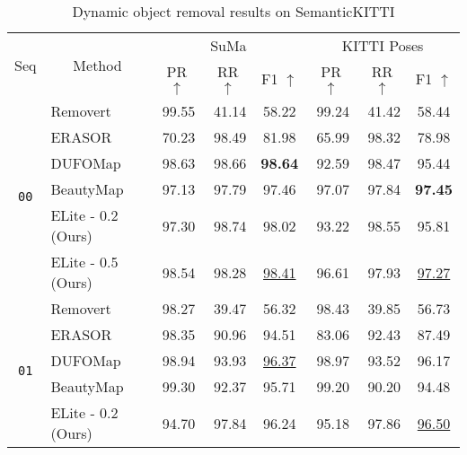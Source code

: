 \begin{table}[t!]
\centering
\caption{Dynamic object removal results on SemanticKITTI}
\begin{adjustbox}{width=1.0\linewidth}
{
\begin{tabular}{c|l|rrc|rrc}
\toprule[0.8pt]
\multicolumn{1}{l|}{\multirow{2}{*}{Seq}} & \multicolumn{1}{c|}{\multirow{2}{*}{Method}}  & \multicolumn{3}{c|}{SuMa \cite{behley2019semantickitti,behley2018efficient}} & \multicolumn{3}{c}{KITTI Poses \cite{geiger2013vision}} \\ \cmidrule{3-8}
                                             &                                               & \multicolumn{1}{c}{PR $\uparrow$} & \multicolumn{1}{c}{RR $\uparrow$} & F1 $\uparrow$ & \multicolumn{1}{c}{PR $\uparrow$} & \multicolumn{1}{c}{RR $\uparrow$} & F1 $\uparrow$ \\
\midrule[0.6pt]
\multirow{6}{*}{\texttt{00}} & Removert \cite{kim2020remove}   & 99.55 & 41.14 & 58.22  & 99.24 & 41.42 & 58.44           \\
                    & ERASOR \cite{lim2021erasor}    & 70.23 & 98.49 & 81.98   & 65.99 & 98.32 & 78.98                    \\
                    & DUFOMap \cite{duberg2024dufomap}    & 98.63 & 98.66 & \textbf{98.64}  & 92.59 & 98.47 & 95.44           \\
                    & BeautyMap \cite{jia2024beautymap}   & 97.13 & 97.79 & 97.46 & 97.07 & 97.84 & \textbf{97.45}           \\
                    & ELite - 0.2 (Ours) & 97.30 & 98.74 & 98.02 & 93.22 & 98.55 & 95.81        \\
                    & ELite - 0.5 (Ours) & 98.54 & 98.28 & \underline{98.41} & 96.61 & 97.93 & \underline{97.27}        \\ 
                    \midrule
\multirow{6}{*}{\texttt{01}} & Removert \cite{kim2020remove}   & 98.27 & 39.47 & 56.32  & 98.43 & 39.85 & 56.73                    \\
                    & ERASOR \cite{lim2021erasor}    & 98.35 & 90.96 & 94.51    & 83.06 & 92.43 & 87.49                    \\
                    & DUFOMap \cite{duberg2024dufomap}    & 98.94 & 93.93 & \underline{96.37}  & 98.97 & 93.52 & 96.17        \\
                    & BeautyMap \cite{jia2024beautymap}    & 99.30 & 92.37 & 95.71 & 99.20 & 90.20 & 94.48                    \\
                    & ELite - 0.2 (Ours) & 94.70 & 97.84 & 96.24 & 95.18 & 97.86 & \underline{96.50}        \\

\end{tabular}}
\end{adjustbox}
\end{table}
